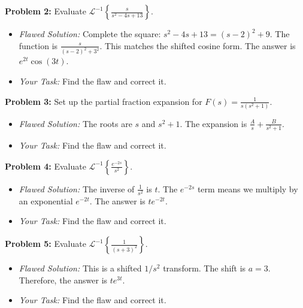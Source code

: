 \documentclass[11pt, a4paper]{article}
\theoremstyle{definition}
\theoremstyle{remark}
\newcommand{\InvLaplace}{\mathcal{L}^{-1}}
\begin{document}
\textbf{Problem 2:} Evaluate $\InvLaplace\left\{ \frac{s}{s^2 - 4s + 13} \right\}$.
\begin{itemize}
    \item \textit{Flawed Solution:} Complete the square: $s^2 - 4s + 13 = (s-2)^2 + 9$. The function is $\frac{s}{(s-2)^2 + 3^2}$. This matches the shifted cosine form. The answer is $e^{2t}\cos(3t)$.
    \item \textit{Your Task:} Find the flaw and correct it.
\end{itemize}

\textbf{Problem 3:} Set up the partial fraction expansion for $F(s) = \frac{1}{s(s^2+1)}$.
\begin{itemize}
    \item \textit{Flawed Solution:} The roots are $s$ and $s^2+1$. The expansion is $\frac{A}{s} + \frac{B}{s^2+1}$.
    \item \textit{Your Task:} Find the flaw and correct it.
\end{itemize}

\textbf{Problem 4:} Evaluate $\InvLaplace\left\{ \frac{e^{-2s}}{s^2} \right\}$.
\begin{itemize}
    \item \textit{Flawed Solution:} The inverse of $\frac{1}{s^2}$ is $t$. The $e^{-2s}$ term means we multiply by an exponential $e^{-2t}$. The answer is $t e^{-2t}$.
    \item \textit{Your Task:} Find the flaw and correct it.
\end{itemize}

\textbf{Problem 5:} Evaluate $\InvLaplace\left\{ \frac{1}{(s+3)^2} \right\}$.
\begin{itemize}
    \item \textit{Flawed Solution:} This is a shifted $1/s^2$ transform. The shift is $a=3$. Therefore, the answer is $t e^{3t}$.
    \item \textit{Your Task:} Find the flaw and correct it.
\end{itemize}
\end{document}
